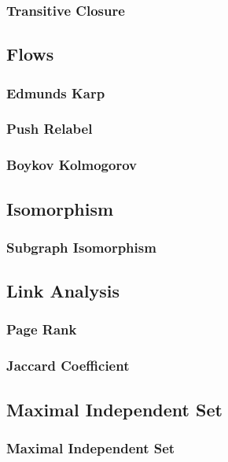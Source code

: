 \subsubsection{Transitive Closure}

\subsection{Flows}
\subsubsection{Edmunds Karp}
\subsubsection{Push Relabel}
\subsubsection{Boykov Kolmogorov}

\subsection{Isomorphism}
\subsubsection{Subgraph Isomorphism}

\subsection{Link Analysis}
\subsubsection{Page Rank}
\subsubsection{Jaccard Coefficient}

\subsection{Maximal Independent Set}
\subsubsection{Maximal Independent Set}

